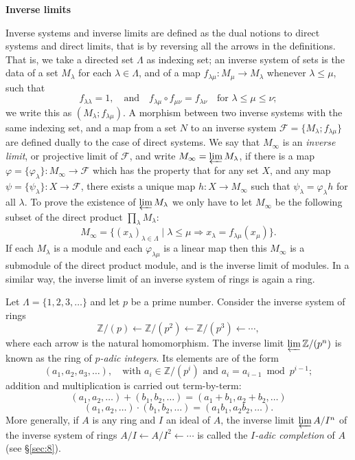 \medskip
\noindent\textbf{Inverse limits}

Inverse systems and inverse limits are defined as the dual notions to direct
systems and direct limits, that is by reversing all the arrows in the
definitions. That is, we take a directed set $\Lambda$ as indexing set; an inverse
system of sets is the data of a set $M_\lambda$ for each $\lambda \in \Lambda$, and of a map
$f_{\lambda\mu}\colon M_\mu \to M_\lambda$ whenever $\lambda \le \mu$, such that
\[
  f_{\lambda\lambda} = 1, \quad \text{and} \quad f_{\lambda\mu} \circ f_{\mu\nu} = f_{\lambda\nu}
      \quad \text{for } \lambda \le \mu \le \nu;
\]
we write this as $(M_\lambda; f_{\lambda\mu})$. A morphism between two inverse systems with
the same indexing set, and a map from a set $N$ to an inverse system
$\mathcal{F} = \{M_\lambda; f_{\lambda\mu}\}$ are defined dually to the case of direct systems. We say
that $M_\infty$ is an \emph{inverse limit}, or projective limit of $\mathcal{F}$, and write
$M_\infty = \varprojlim M_\lambda$, if there is a map $\varphi = \{\varphi_\lambda\}\colon M_\infty \to \mathcal{F}$ which has the
property that for any set $X$, and any map $\psi = \{\psi_\lambda\}\colon X \to \mathcal{F}$, there exists a
unique map $h\colon X \to M_\infty$ such that $\psi_\lambda = \varphi_\lambda h$ for all $\lambda$. To prove the
existence of $\varprojlim M_\lambda$ we only have to let $M_\infty$ be the following subset of the
direct product $\prod_\lambda M_\lambda$:
\[
  M_\infty = \{(x_\lambda)_{\lambda \in \Lambda} \mid \lambda \le \mu \Rightarrow x_\lambda =
      f_{\lambda\mu}(x_\mu)\}.
\]
If each $M_\lambda$ is a module and each $\varphi_{\lambda\mu}$ is a linear map then this $M_\infty$ is a
submodule of the direct product module, and is the inverse limit of modules.
In a similar way, the inverse limit of an inverse system of rings is again a
ring.

\begin{example*}
Let $\Lambda = \{1, 2, 3, \ldots\}$ and let $p$ be a prime number. Consider the inverse
system of rings
\[
  \mathbb{Z}/(p) \leftarrow \mathbb{Z}/(p^2) \leftarrow \mathbb{Z}/(p^3) \leftarrow \cdots,
\]
where each arrow is the natural homomorphism. The inverse limit
$\varprojlim \mathbb{Z}/(p^n)$ is known as the ring of \emph{$p$-adic integers}. Its elements are of
the form
\[
  (a_1, a_2, a_3, \ldots), \quad \text{with } a_i \in \mathbb{Z}/(p^i) \text{ and } a_i = a_{i-1} \bmod p^{i-1};
\]
addition and multiplication is carried out term-by-term:
\[
  (a_1, a_2, \ldots) + (b_1, b_2, \ldots) = (a_1 + b_1, a_2 + b_2, \ldots)
\]
\[
  (a_1, a_2, \ldots) \cdot (b_1, b_2, \ldots) = (a_1b_1, a_2b_2, \ldots).
\]
More generally, if $A$ is any ring and $I$ an ideal of $A$, the inverse limit
$\varprojlim A/I^n$ of the inverse system of rings $A/I \leftarrow A/I^2 \leftarrow \cdots$ is called the
\emph{$I$-adic completion} of $A$ (see \S\ref{sec:8}).
\end{example*}

